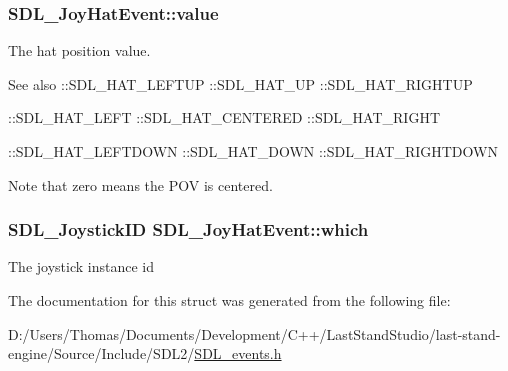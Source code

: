 \subsubsection[{value}]{ S\+D\+L\+\_\+\+Joy\+Hat\+Event\+::value}\label{structSDL__JoyHatEvent_a52b179a34407449941b61d988ca72ef4}
The hat position value. \begin{DoxySeeAlso}{See also}
\+::\+S\+D\+L\+\_\+\+H\+A\+T\+\_\+\+L\+E\+F\+T\+U\+P \+::\+S\+D\+L\+\_\+\+H\+A\+T\+\_\+\+U\+P \+::\+S\+D\+L\+\_\+\+H\+A\+T\+\_\+\+R\+I\+G\+H\+T\+U\+P 

\+::\+S\+D\+L\+\_\+\+H\+A\+T\+\_\+\+L\+E\+F\+T \+::\+S\+D\+L\+\_\+\+H\+A\+T\+\_\+\+C\+E\+N\+T\+E\+R\+E\+D \+::\+S\+D\+L\+\_\+\+H\+A\+T\+\_\+\+R\+I\+G\+H\+T 

\+::\+S\+D\+L\+\_\+\+H\+A\+T\+\_\+\+L\+E\+F\+T\+D\+O\+W\+N \+::\+S\+D\+L\+\_\+\+H\+A\+T\+\_\+\+D\+O\+W\+N \+::\+S\+D\+L\+\_\+\+H\+A\+T\+\_\+\+R\+I\+G\+H\+T\+D\+O\+W\+N
\end{DoxySeeAlso}
Note that zero means the P\+O\+V is centered. \hypertarget{structSDL__JoyHatEvent_ac9d9bb179f9116d16b3da47cacd74b55}{}
\subsubsection[{which}]{\setlength{\rightskip}{0pt plus 5cm}S\+D\+L\+\_\+\+Joystick\+I\+D S\+D\+L\+\_\+\+Joy\+Hat\+Event\+::which}\label{structSDL__JoyHatEvent_ac9d9bb179f9116d16b3da47cacd74b55}
The joystick instance id 

The documentation for this struct was generated from the following file\+:\begin{DoxyCompactItemize}
\item 
D\+:/\+Users/\+Thomas/\+Documents/\+Development/\+C++/\+Last\+Stand\+Studio/last-\/stand-\/engine/\+Source/\+Include/\+S\+D\+L2/\hyperlink{SDL__events_8h}{S\+D\+L\+\_\+events.\+h}\end{DoxyCompactItemize}

